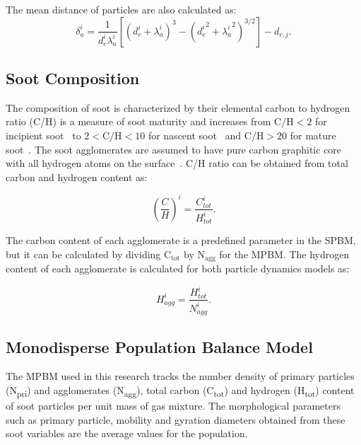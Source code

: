 The mean distance of particles are also calculated as:
\begin{equation}
	\delta^i_a=\frac{1}{d^i_c\lambda^i_a}
	\left[
		\left(
			d^i_c+\lambda^i_a
		\right)^3
		-\left(
			{d^i_c}^2+{\lambda^i_a}^2
		\right)^{3 / 2}
	\right]
	-d_{c, j}    
	\label{eqn:meandist}.
\end{equation}

\subsection{Soot Composition}
The composition of soot is characterized by their elemental carbon to hydrogen ratio (C/H) is a measure of soot maturity and increases from $\mathrm{C/H<2}$ for incipient soot~\citep{ciajolo1998spectroscopic} to $\mathrm{2<C/H<10}$ for nascent soot~\citep{betrancourt2017investigation} and $\mathrm{C/H>20}$ for mature soot~\citep{michelsen2017probing}. The soot agglomerates are assumed to have pure carbon graphitic core~\citep{kholghy2016core} with all hydrogen atoms on the surface~\citep{blanquart2009analyzing}. C/H ratio can be obtained from total carbon and hydrogen content as:

\begin{equation}
	\left(
		\frac{C}{H}
	\right)^i
	=\frac{C^i_{tot}}{H^i_{tot}}   
	\label{eqn:CtoH}.
\end{equation}

The carbon content of each agglomerate is a predefined parameter in the SPBM, but it can be calculated by dividing $\mathrm{C_{tot}}$ by $\mathrm{N_{agg}}$ for the MPBM. The hydrogen content of each agglomerate is calculated for both particle dynamics models as:

\begin{equation}
	H^i_{agg}
	=\frac{H^i_{tot}}{N^i_{agg}}   
	\label{eqn:Hagg}.
\end{equation}


\subsection{Monodisperse Population Balance Model}
The MPBM used in this research tracks the number density of primary particles (N\textsubscript{pri}) and agglomerates (N\textsubscript{agg}), total carbon (C\textsubscript{tot}) and hydrogen (H\textsubscript{tot}) content of soot particles per unit mass of gas mixture. The morphological parameters such as primary particle, mobility and gyration diameters obtained from these soot variables are the average values for the population.

